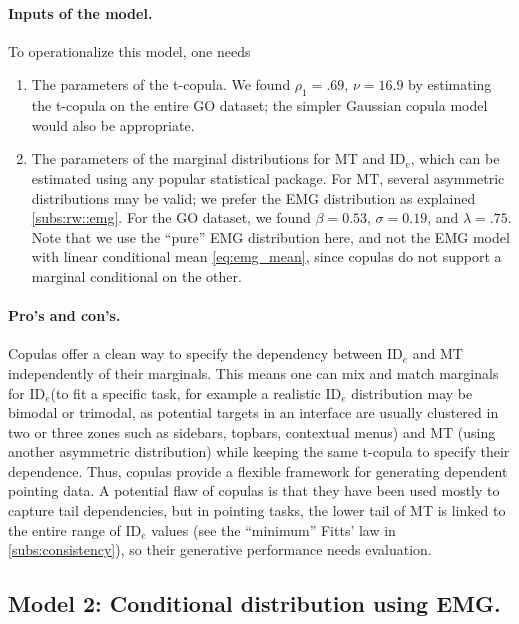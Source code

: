 \documentclass[acmlarge, manuscript,review]{acmart}
\newcommand{\ide}{\ensuremath{{\text{ID}_e}}\xspace}
\begin{document}
\paragraph{Inputs of the model.} To operationalize this model, one needs
\begin{enumerate}
	\item The parameters of the t-copula. We found $\rho_1 = .69$, $\nu = 16.9$ by estimating the t-copula on the entire GO dataset; the simpler Gaussian copula model would also be appropriate.
	\item The parameters of the marginal distributions for MT and \ide, which can be estimated using any popular statistical package. For MT, several asymmetric distributions may be valid; we prefer the EMG distribution as explained \autoref{subs:rw::emg}. For the GO dataset, we found $\beta = 0.53$, $\sigma = 0.19$, and $\lambda= .75$. Note that we use the ``pure'' EMG distribution here, and not the EMG model with linear conditional mean \autoref{eq:emg_mean}, since copulas do not support a marginal conditional on the other.
\end{enumerate}


\paragraph{Pro's and con's.} Copulas offer a clean way to specify the dependency between \ide and MT independently of their marginals. This means one can mix and match marginals for \ide (\eg to fit a specific task, for example a realistic \ide distribution may be bimodal or trimodal, as potential targets in an interface are usually clustered in two or three zones such as sidebars, topbars, contextual menus) and MT (\eg using another asymmetric distribution) while keeping the same t-copula to specify their dependence. Thus, copulas provide a flexible framework for generating dependent pointing data.
A potential flaw of copulas is that they have been used mostly to capture tail dependencies, but in pointing tasks, the lower tail of MT is linked to the entire range of \ide values (see the ``minimum'' Fitts' law in \autoref{subs:consistency}), so their generative performance needs evaluation. 



\subsection{Model 2: Conditional distribution using EMG.}
\end{document}
